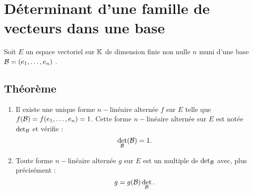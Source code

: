 \section{Déterminant d’une famille de vecteurs dans une base}
    Soit \(E\) un espace vectoriel sur \(\K\) de dimension finie non nulle \(n\) muni d’une base \(\cal{B} = (e_1, \dots  , e_n)\) .
\subsection{Théorème}
\begin{theo}
    \begin{enumerate}
        \item Il existe une unique forme \(n-\)linéaire  alternée \(f\) sur \(E\) telle que \(f (\cal{B}) = f (e_1, \dots  , e_n) = 1\).
            Cette forme \(n-\)linéaire  alternée sur \(E\) est notée \(\det_{\cal{B}}\) et vérifie :
                \[\det_{\cal{B}}(\cal{B}) = 1.\]
        \item Toute forme \(n-\)linéaire  alternée \(g\) sur \(E\) est un multiple de \(\det_{\cal{B}}\) avec, plus précisément :
            \[g = g (\cal{B}) \det_{\cal{B}}.\]
    \end{enumerate}
\end{theo}
